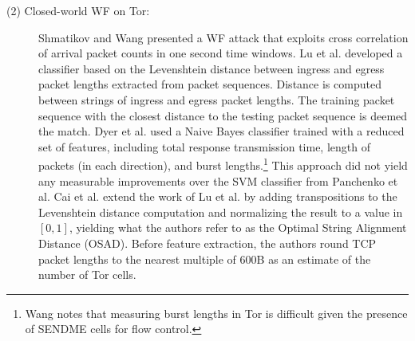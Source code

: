 \documentclass[runningheads]{llncs}
\begin{document}
\begin{description}

\item [(2) Closed-world WF on Tor:] Shmatikov and Wang \cite{shmatikov2006timing}
presented a WF attack that exploits cross correlation of arrival packet counts in
one second time windows.
Lu et al. \cite{lu2010website} developed a classifier based on the Levenshtein distance between
ingress and egress packet lengths extracted from packet sequences. Distance is computed between
strings of ingress and egress packet lengths. The training packet sequence with the closest
distance to the testing packet sequence is deemed the match. Dyer et al. \cite{dyer2012peek}
used a Naive Bayes classifier trained with a reduced set of features, including total
response transmission time, length of packets (in each direction), and burst lengths.\footnote{Wang
\cite{wang2016website} notes that measuring burst lengths in Tor is difficult given the presence of
SENDME cells for flow control.} This approach did not yield any measurable improvements over
the SVM classifier from Panchenko et al. Cai et al. \cite{cai2012touching} extend the work of Lu et al.
by adding transpositions to the Levenshtein distance computation and normalizing the result to
a value in $[0,1]$, yielding what the authors refer to as the Optimal String Alignment Distance
(OSAD). Before feature extraction, the authors round TCP packet lengths to the nearest multiple of
$600$B as an estimate of the number of Tor cells.


\end{description}
\end{document}
